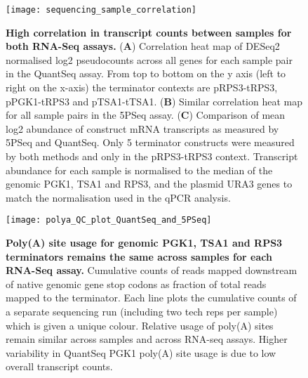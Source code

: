 \documentclass[../main.tex]{subfiles}
\begin{document}
\begin{figure}[ph!]

{\centering \texttt{[image: sequencing\_sample\_correlation]} 

}

\caption[High correlation in transcript counts between samples for both RNA-Seq assays.]{\textbf{High correlation in transcript counts between samples for both RNA-Seq assays.} (\textbf{A}) Correlation heat map of DESeq2 normalised log2 pseudocounts across all genes for each sample pair in the QuantSeq assay. From top to bottom on the y axis (left to right on the x-axis) the terminator contexts are pRPS3-tRPS3, pPGK1-tRPS3 and pTSA1-tTSA1. (\textbf{B}) Similar correlation heat map for all sample pairs in the 5PSeq assay. (\textbf{C}) Comparison of mean log2 abundance of construct mRNA transcripts as measured by 5PSeq and QuantSeq. Only 5 terminator constructs were measured by both methods and only in the pRPS3-tRPS3 context. Transcript abundance for each sample is normalised to the median of the genomic PGK1, TSA1 and RPS3, and the plasmid URA3 genes to match the normalisation used in the qPCR analysis.}\label{fig:rnaseq-QC-correlation}
\end{figure}

\begin{figure}[ph!]

{\centering \texttt{[image: polya\_QC\_plot\_QuantSeq\_and\_5PSeq]} 

}

\caption[Poly(A) site usage for genomic PGK1, TSA1 and RPS3 terminators remains the same across samples for each RNA-Seq assay.]{\textbf{Poly(A) site usage for genomic PGK1, TSA1 and RPS3 terminators remains the same across samples for each RNA-Seq assay.} Cumulative counts of reads mapped downstream of native genomic gene stop codons as fraction of total reads mapped to the terminator. Each line plots the cumulative counts of a separate sequencing run (including two tech reps per sample) which is given a unique colour. Relative usage of poly(A) sites remain similar across samples and across RNA-seq assays. Higher variability in QuantSeq PGK1 poly(A) site usage is due to low overall transcript counts.}\label{fig:rnaseq-QC-QuantSeq-and-5PSeq-genomic-polyA}
\end{figure}
\end{document}
